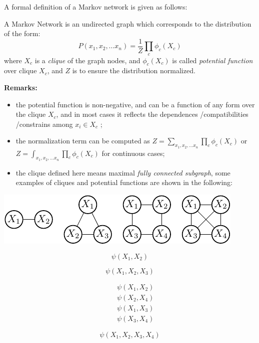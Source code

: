 A formal definition of a Markov network is given as follows: 
\begin{definition}
 A Markov Network is an undirected graph which corresponds to the distribution of the form:
 \begin{equation}
  P(x_1,x_2,...x_n)=\frac{1}{Z}\prod_{c}\phi_c(X_c)
  \label{equ:MN_factorization}
 \end{equation}
 where $X_c$ is a \emph{clique} of the graph nodes, and $\phi_c(X_c)$ is called \emph{potential function} over clique $X_c$, and $Z$ is to ensure the distribution normalized.
\end{definition}
\textbf{Remarks:}
\begin{itemize}
 \item the potential function is non-negative, and can be a function of any form over the clique $X_c$, and in most cases it reflects the dependences /compatibilities /constrains among $x_i\in X_c$ ;
 \item the normalization term can be computed as $Z=\sum_{x_1,x_2,...x_n}\prod_{c}\phi_c(X_c)$ or $Z=\int_{x_1,x_2,...x_n}\prod_{c}\phi_c(X_c)$ for continuous cases;
 \item the clique defined here means maximal \emph{fully connected subgraph}, some examples of cliques and potential functions are shown in the following: 
\end{itemize}
\includegraphics[width=\textwidth]{./Figures/clique}\newline
\begin{minipage}[c]{0.24\textwidth}
 \begin{equation*}
  \psi(X_1,X_2)
 \end{equation*}
\end{minipage}
\begin{minipage}[c]{0.24\textwidth}
 \begin{equation*}
  \psi(X_1,X_2,X_3)
 \end{equation*}
\end{minipage}
\begin{minipage}[c]{0.25\textwidth}
 \begin{equation*}
  \begin{array}{rcl}
   && \psi(X_1,X_2)\\
   && \psi(X_2,X_4)\\
   && \psi(X_1,X_3)\\
   && \psi(X_3,X_4)
  \end{array}
 \end{equation*}
\end{minipage}
\begin{minipage}[c]{0.24\textwidth}
 \begin{equation*}
 \psi(X_1,X_2,X_3,X_4)
 \end{equation*}
\end{minipage}


